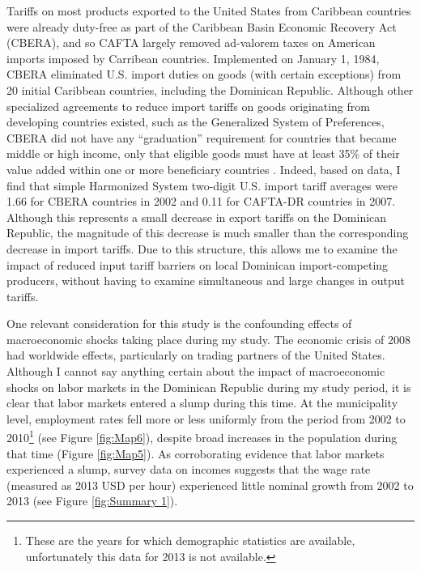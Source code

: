 \documentclass[12pt]{article}
\begin{document}
Tariffs on most products exported to the United States from Caribbean countries were 
already duty-free as part of the Caribbean Basin Economic Recovery Act (CBERA), and so CAFTA largely 
removed ad-valorem taxes on American imports imposed by Carribean countries. 
Implemented on January 1, 1984, CBERA eliminated U.S. import duties on goods (with certain
exceptions) from 20 initial Caribbean countries, including the Dominican Republic.
Although other specialized agreements to reduce import tariffs on goods originating from developing 
countries existed, such as the Generalized System of Preferences, CBERA did not have any ``graduation''
requirement for countries that became middle or high income, only that eligible  
goods must have at least 35\% of their value added within one or more beneficiary countries 
\citep{pelzman}. Indeed, based on \citeauthor{wtotariff} data, I find that simple Harmonized
System two-digit U.S. import tariff averages were 1.66 for CBERA countries in 2002 and 0.11 for 
CAFTA-DR countries in 2007. Although this represents a small decrease in export tariffs on
the Dominican Republic, the magnitude of this decrease is much smaller than the corresponding
decrease in import tariffs. Due to this structure, this allows me to examine the impact of reduced 
input tariff barriers on local Dominican import-competing producers, without having to 
examine simultaneous and large changes in output tariffs.

One relevant consideration for this study is the confounding effects of macroeconomic shocks 
taking place during my study. The economic crisis of 2008 had worldwide effects, particularly
on trading partners of the United States. Although I cannot say anything certain about the impact
of macroeconomic shocks on labor markets in the Dominican Republic during my study period, 
it is clear that labor markets entered a slump during this time. At the municipality level, employment
rates fell more or less uniformly from the period from 2002 to 2010\footnote{These are the years for
which demographic statistics are available, unfortunately this data for 2013 is not available.} (see
Figure \ref{fig:Map6}), despite broad increases in the population during that time (Figure \ref{fig:Map5}).
As corroborating evidence that labor markets experienced a slump, survey data on incomes suggests
that the wage rate (measured as 2013 USD per hour) experienced little nominal growth from 
2002 to 2013 (see Figure \ref{fig:Summary 1}).

\vspace{-10pt}
\end{document}
